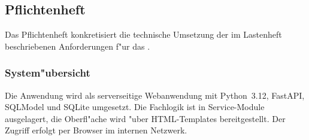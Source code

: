 \subsection{Pflichtenheft}
\label{app:Pflichtenheft}

Das Pflichtenheft konkretisiert die technische Umsetzung der im Lastenheft
beschriebenen Anforderungen f"ur das .

\subsubsection*{System"ubersicht}
Die Anwendung wird als serverseitige Webanwendung mit Python~3.12, FastAPI,
SQLModel und SQLite umgesetzt. Die Fachlogik ist in Service-Module ausgelagert,
die Oberfl"ache wird "uber HTML-Templates bereitgestellt. Der Zugriff erfolgt
per Browser im internen Netzwerk.

